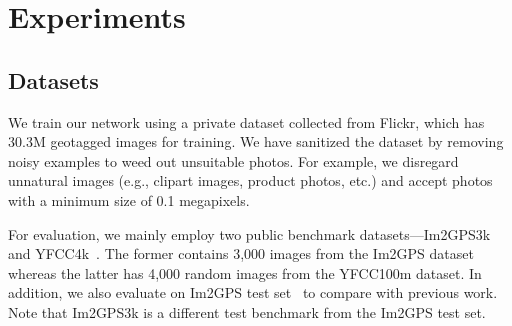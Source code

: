 \documentclass[runningheads]{llncs}
\newcommand{\hsseo}[1]{\textcolor{blue}{#1}}
\begin{document}
\iffalse
\subsection{Implementation Details for Inference}
{\color{red} [This subsection is almost redundant.]}
For implementation of the inference procedure with combinatorial partitioning, we define multiple geoclass sets by uniquely merging locally connected S2 cells at a certain level as described in Section~\ref{sec:sub:geo_gen}. 
\hsseo{
As we maintain the region for a geoclass using a set of S2 cells,
our model assigns a score of each geoclass to its corresponding S2 cells after normalization described by Eq.~\eqref{eq:norm}.
}
Since each geoclass set covers the entire earth, every S2 cell gets a score from each classifier and the scores of an S2 cell obtained from multiple classifiers are accumulated.
Finally, our model selects the locally connected S2 cells with the highest accumulated scores, and computes the center by averaging\footnote{Because a simple average of latitude and longitude values introduces large errors near polar regions, we convert latitudes and longitudes into 3D Cartesian coordinates, average them, and convert the result back to latitude and longitude space.} the S2 cell centers weighted by number of training images contained in individual cells.
Note that the center of each S2 cell is precomputed by averaging the locations of training images within the cell.
\fi


 

\section{Experiments}
\label{sec:exp}

\subsection{Datasets}
\label{sub:datasets}
We train our network using a private dataset collected from Flickr, which has 30.3M geotagged images for training. 
We have sanitized the dataset by removing noisy examples to weed out unsuitable photos. 
For example, we disregard unnatural images (e.g., clipart images, product photos, etc.) and accept photos with a minimum size of 0.1 megapixels.


For evaluation, we mainly employ two public benchmark datasets---Im2GPS3k and YFCC4k~\cite{vo17revisiting}. 
The former contains 3,000 images from the Im2GPS dataset whereas the latter has 4,000 random images from the YFCC100m dataset.
In addition, we also evaluate on Im2GPS test set~\cite{hays08im2gps} to compare with previous work.
Note that Im2GPS3k is a different test benchmark from the Im2GPS test set.
\end{document}
